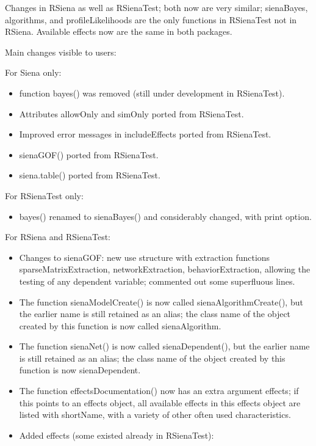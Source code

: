 \documentclass[a4paper,fleqn,11pt]{article}
\newcommand{\+}{\, + \,}
\newcommand{\sfn}[1]{\textsf{#1}}
\begin{document}
\begin{small}
\begin{itemize}
  Changes in RSiena as well as RSienaTest;
  both now are very similar; \sfn{sienaBayes}, \sfn{algorithms}, and
  \sfn{profileLikelihoods}
  are the only functions in RSienaTest not in RSiena.
  Available effects now are the same in both packages.

  Main changes visible to users:

For Siena only:
  \begin{itemize}
	\item function \sfn{bayes()} was removed (still under development in
        RSienaTest).
	\item Attributes \sfn{allowOnly} and \sfn{simOnly} ported from
        RSienaTest.
	\item Improved error messages in  \sfn{includeEffects} ported from
        RSienaTest.
	\item \sfn{sienaGOF()} ported from RSienaTest.
	\item \sfn{siena.table()} ported from RSienaTest.
  \end{itemize}

For RSienaTest only:
  \begin{itemize}
	\item \sfn{bayes()} renamed to \sfn{sienaBayes()} and considerably changed,
         with print option.
  \end{itemize}

For RSiena and RSienaTest:
  \begin{itemize}
	\item Changes to \sfn{sienaGOF}: new use structure with extraction functions
		\sfn{sparseMatrixExtraction}, \sfn{networkExtraction},
        \sfn{behaviorExtraction},
		allowing the testing of any dependent variable;
		commented out some superfluous lines.
	\item The function \sfn{sienaModelCreate()} is now called
        \sfn{sienaAlgorithmCreate()},
		but the earlier name is still retained as an alias;
		the class name of the object created by this function is now called
		\sfn{sienaAlgorithm}.
	\item The function \sfn{sienaNet()} is now called \sfn{sienaDependent()},
		but the earlier name is still retained as an alias;
		the class name of the object created by this function is now
		\sfn{sienaDependent}.
	\item The function \sfn{effectsDocumentation()} now has an extra argument
        \sfn{effects};
		if this points to an effects object, all available effects
		in this effects object are listed with \sfn{shortName},
		with a variety of other often used characteristics.
	\item Added effects (some existed already in \sfn{RSienaTest}):


\end{itemize}
\end{itemize}
\end{small}
\end{document}
